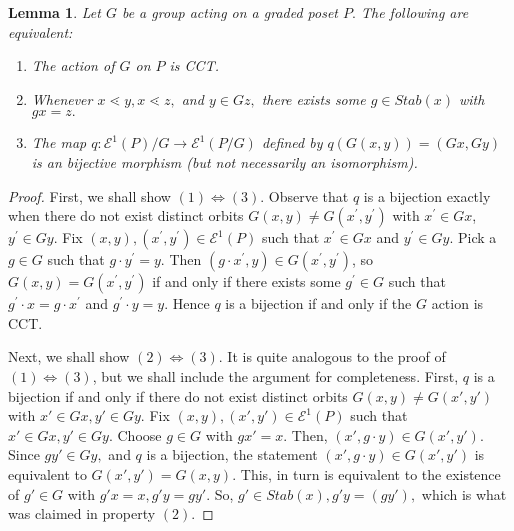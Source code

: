 \documentclass[10 pt]{amsart}
\theoremstyle{plain}
\newtheorem{lem}[thm]{Lemma}
\theoremstyle{definition}
\theoremstyle{remark}
\numberwithin{equation}{section}
\renewcommand{\iff}{\Leftrightarrow}
\begin{document}
\begin{lem}
\label{lem:cover_transitive_equivalence}
Let $G$ be a group acting on a graded poset $P.$ The following are equivalent:
\begin{enumerate}
	\item The action of $G$ on $P$ is CCT.
	\item Whenever $x \lessdot y,x \lessdot z,$ and $y \in Gz,$ there exists some $g \in Stab(x)$ with $gx = z.$
	\item The map $q\colon \mathcal E^1(P)/G\rightarrow \mathcal E^1(P/G)$ defined by $q(G(x, y)) = (Gx,Gy)$ is an bijective morphism (but not necessarily an isomorphism).
\end{enumerate}
\end{lem}
\begin{proof}
First, we shall show $(1) \iff (3)$. Observe that $q$ is a bijection exactly when there do not exist distinct orbits $G(x, y) \ne G(x^\prime, y^\prime)$ with $x^\prime\in Gx$, $y^\prime\in Gy$.  Fix $(x, y), (x^\prime, y^\prime)\in \mathcal E^1(P)$ such that $x^\prime\in Gx$ and $y^\prime\in Gy$.  Pick a $g\in G$ such that $g\cdot y^\prime = y$.  Then $(g\cdot x^\prime, y)\in G(x^\prime, y^\prime)$, so $G(x, y) = G(x^\prime, y^\prime)$ if and only if there exists some $g^\prime\in G$ such that $g^\prime\cdot x = g\cdot x^\prime$ and $g^\prime\cdot y = y$. Hence $q$ is a bijection if and only if the $G$ action is CCT.

Next, we shall show $(2) \iff (3)$. It is quite analogous to the proof of $(1) \iff (3)$, but we shall include the argument for completeness. 
First, $q$ is a bijection if and only if there do not exist distinct orbits $G(x, y) \neq G(x', y')$ with $x' \in Gx,y'\in Gy.$ Fix $(x, y),(x', y') \in \mathcal E^1(P)$ such that $x' \in Gx,y'\in Gy$. Choose $g \in G$ with $gx' = x.$ Then, $(x', g\cdot y) \in G(x', y').$ Since $g y' \in Gy,$ and $q$ is a bijection, the statement $(x' , g\cdot y) \in G(x', y')$ is equivalent to $G(x', y') = G(x, y).$ This, in turn is equivalent to the existence of $g' \in G$ with $g'x = x,g'y = gy'.$ So, $g' \in Stab(x),g'y = (gy'),$ which is what was claimed in property $(2)$.


\end{proof}
\end{document}
